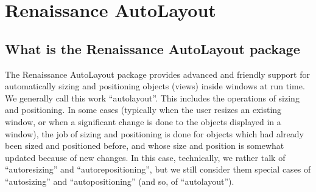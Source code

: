 \chapter{Renaissance AutoLayout}

\section{What is the Renaissance AutoLayout package}
The Renaissance AutoLayout package provides advanced and friendly support
for automatically sizing and positioning objects (views) inside
windows at run time.  We generally call this work ``autolayout''.
This includes the operations of sizing and positioning.  In some cases
(typically when the user resizes an existing window, or when a
significant change is done to the objects displayed in a window), the
job of sizing and positioning is done for objects which had already
been sized and positioned before, and whose size and position is
somewhat updated because of new changes.  In this case, technically,
we rather talk of ``autoresizing'' and ``autorepositioning'', but we
still consider them special cases of ``autosizing'' and
``autopositioning'' (and so, of ``autolayout'').

